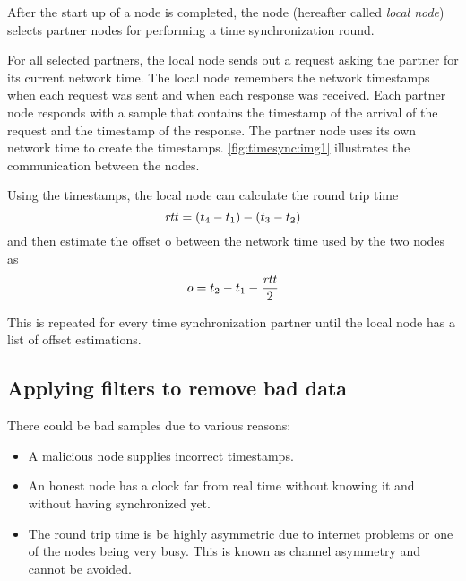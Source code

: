 After the start up of a node is completed, the node (hereafter called \emph{local node}) selects partner nodes for performing a time synchronization round.

For all selected partners, the local node sends out a request asking the partner for its current network time.
The local node remembers the network timestamps when each request was sent and when each response was received.
Each partner node responds with a sample that contains the timestamp of the arrival of the request and the timestamp of the response.
The partner node uses its own network time to create the timestamps.
\autoref{fig:timesync:img1} illustrates the communication between the nodes.

\begin{figure}
\end{figure}

Using the timestamps, the local node can calculate the round trip time
$$\mathit{rtt} = (t_4 - t_1) - (t_3 - t_2)$$
and then estimate the offset o between the network time used by the two nodes as
$$o = t_2 - t_1 - \frac{\mathit{rtt}}{2}$$

This is repeated for every time synchronization partner until the local node has a list of offset estimations.

\subsection{Applying filters to remove bad data}

There could be bad samples due to various reasons:
\begin{itemize}
\item A malicious node supplies incorrect timestamps.
\item An honest node has a clock far from real time without knowing it and without having synchronized yet.
\item The round trip time is be highly asymmetric due to internet problems or one of the nodes being very busy.
This is known as channel asymmetry and cannot be avoided.
\end{itemize}

